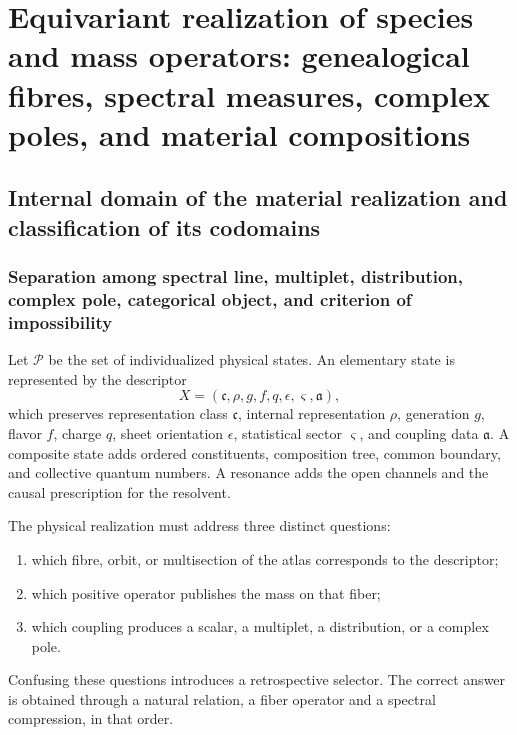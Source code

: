 
\chapter{Equivariant realization of species and mass operators: genealogical fibres, spectral measures, complex poles, and material compositions}
\label{hmtmasscl:chap-realizacion-equiv}

\section{Internal domain of the material realization and classification of its codomains}

\subsection{Separation among spectral line, multiplet, distribution, complex pole, categorical object, and criterion of impossibility}

Let \(\mathcal P\) be the set of individualized physical states. An elementary
state is represented by the descriptor
\[
 X=(\mathfrak c,\rho,g,f,q,\epsilon,\varsigma,\mathfrak a),
\]
which preserves representation class \(\mathfrak c\), internal representation
\(\rho\), generation \(g\), flavor \(f\), charge \(q\), sheet orientation
\(\epsilon\), statistical sector \(\varsigma\), and coupling data
\(\mathfrak a\). A composite state adds ordered constituents, composition
tree, common boundary, and collective quantum numbers. A resonance
adds the open channels and the causal prescription for the resolvent.

The physical realization must address three distinct questions:

\begin{enumerate}
\item which fibre, orbit, or multisection of the atlas corresponds to the descriptor;
\item which positive operator publishes the mass on that fiber;
\item which coupling produces a scalar, a multiplet, a distribution, or
      a complex pole.
\end{enumerate}

Confusing these questions introduces a retrospective selector. The correct
answer is obtained through a natural relation, a fiber operator and a
spectral compression, in that order.

